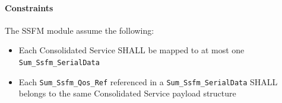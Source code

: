 \paragraph{Constraints}
The SSFM module assume the following: 

\begin{itemize}
    \item Each Consolidated Service SHALL be mapped to at most one \texttt{Sum\_Ssfm\_SerialData} 
	\item Each \texttt{Sum\_Ssfm\_Qos\_Ref} referenced in a \texttt{Sum\_Ssfm\_SerialData} SHALL belongs to the same Consolidated Service payload structure
\end{itemize}